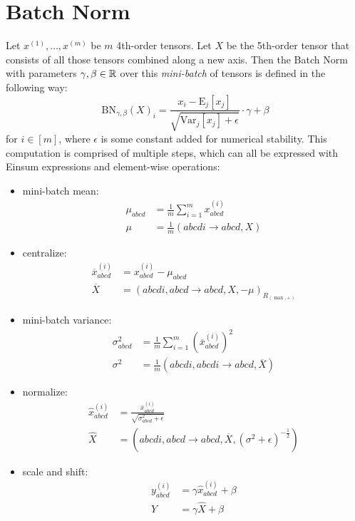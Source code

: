 \section{Batch Norm}
Let $x^{(1)},\dots,x^{(m)}$ be $m$ 4th-order tensors.
Let $X$ be the 5th-order tensor that consists of all those tensors combined along a new axis.
Then the Batch Norm \cite{Ioffe2015} with parameters $\gamma,\beta \in \mathbb{R}$ over this \textit{mini-batch} of tensors is defined in the following way:
$$\text{BN}_{\gamma,\beta}(X)_i = \frac{x_i - \text{E}_j[x_j]}{\sqrt{\text{Var}_j[x_j] + \epsilon}} \cdot \gamma + \beta$$
for $i \in [m]$, where $\epsilon$ is some constant added for numerical stability.
This computation is comprised of multiple steps, which can all be expressed with Einsum expressions and element-wise operations:
\begin{itemize}
    \item mini-batch mean:
          \begin{align*}
              \mu_{abcd} & = \frac{1}{m} \sum\limits_{i = 1}^{m} x^{(i)}_{abcd} \\
              \mu        & = \frac{1}{m} (abcdi \rightarrow abcd, X)
          \end{align*}
    \item centralize:
          \begin{align*}
              \overline{x}^{(i)}_{abcd} & = x^{(i)}_{abcd} - \mu_{abcd}                            \\
              \overline{X}              & = (abcdi, abcd \rightarrow abcd, X, -\mu)_{R_{(\max,+)}}
          \end{align*}
    \item mini-batch variance:
          \begin{align*}
              \sigma^2_{abcd} & = \frac{1}{m} \sum\limits_{i = 1}^{m} \left(\overline{x}^{(i)}_{abcd}\right)^2 \\
              \sigma^2        & = \frac{1}{m} (abcdi,abcdi \rightarrow abcd, \overline{X})
          \end{align*}
    \item normalize:
          \begin{align*}
              \hat{x}^{(i)}_{abcd} & = \frac{\overline{x}^{(i)}_{abcd}}{\sqrt{\sigma^2_{abcd} + \epsilon}}                \\
              \hat{X}              & = (abcdi, abcd \rightarrow abcd, \overline{X}, (\sigma^2 + \epsilon)^{-\frac{1}{2}})
          \end{align*}
    \item scale and shift:
          \begin{align*}
              y^{(i)}_{abcd} & = \gamma \hat{x}^{(i)}_{abcd} + \beta \\
              Y              & = \gamma \hat{X} + \beta
          \end{align*}
\end{itemize}

